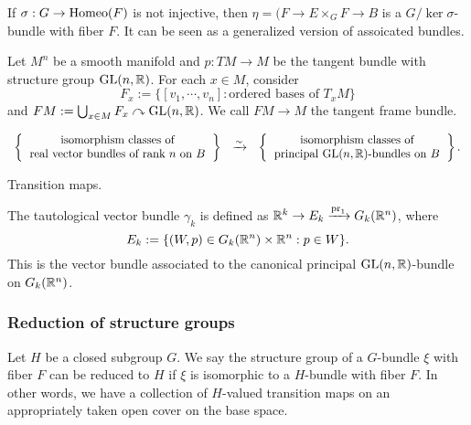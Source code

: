\documentclass{../../../small}
\begin{document}
\begin{rmk*}
If $\sigma:G\to\operatorname{Homeo}(F)$ is not injective, then $\eta=(F\to E\times_GF\to B$ is a $G/\ker\sigma$-bundle with fiber $F$.
It can be seen as a generalized version of assoicated bundles.
\end{rmk*}
\begin{ex*}
Let $M^n$ be a smooth manifold and $p:TM\to M$ be the tangent bundle with structure group $\mathrm{GL}(n,\mathbb{R})$.
For each $x\in M$, consider
\[F_x:=\{[v_1,\cdots,v_n]:\text{ordered bases of }T_xM\}\]
and $FM:=\bigcup_{x\in M}F_x\curvearrowright\mathrm{GL}(n,\mathbb{R})$.
We call $FM\to M$ the tangent frame bundle.
\end{ex*}

\begin{thm*}[2.14]
\[\begin{array}{ccc}
\left\{\begin{tabular}{c}isomorphism classes of\\real vector bundles of rank $n$ on $B$\end{tabular}\right\}
&\xrightarrow{\sim}&
\left\{\begin{tabular}{c}isomorphism classes of\\principal $\GL(n,\R)$-bundles on $B$\end{tabular}\right\}.
\end{array}\]
\end{thm*}
\begin{pf}
Transition maps.
\end{pf}

\begin{ex*}
The tautological vector bundle $\gamma_k$ is defined as $\mathbb{R}^k\to E_k\xrightarrow{\operatorname{pr}_1}G_k(\mathbb{R}^n)$, where
\[E_k:=\{(W,p)\in G_k(\mathbb{R}^n)\times\mathbb{R}^n:p\in W\}.\]
This is the vector bundle associated to the canonical principal $\mathrm{GL}(n,\mathbb{R})$-bundle on $G_k(\mathbb{R}^n)$.
\end{ex*}

\subsubsection*{Reduction of structure groups}
\begin{defn*}[2.15]
Let $H$ be a closed subgroup $G$.
We say the structure group of a $G$-bundle $\xi$ with fiber $F$ can be reduced to $H$ if $\xi$ is isomorphic to a $H$-bundle with fiber $F$.
In other words, we have a collection of $H$-valued transition maps on an appropriately taken open cover on the base space.
\end{defn*}
\end{document}
